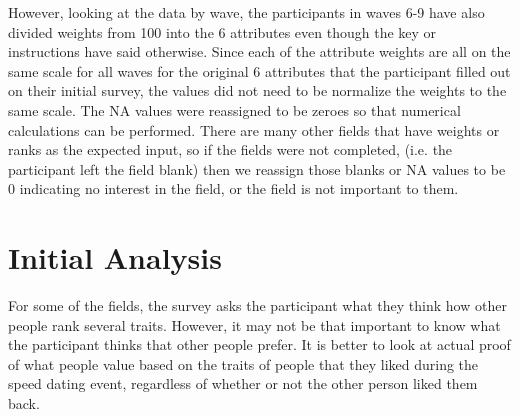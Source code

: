 \documentclass{article}
\begin{document}
However, looking at the data by wave, the participants in waves 6-9 have also divided weights from 100 into the 6 attributes even though the key or instructions have said otherwise. Since each of the attribute weights are all on the same scale for all waves for the original 6 attributes that the participant filled out on their initial survey, the values did not need to be normalize the weights to the same scale.  The NA values were reassigned to be zeroes so that numerical calculations can be performed.  There are many other fields that have weights or ranks as the expected input, so if the fields were not completed, (i.e. the participant left the field blank) then we reassign those blanks or NA values to be 0 indicating no interest in the field, or the field is not important to them.\\



\section{Initial Analysis}

For some of the fields, the survey asks the participant what they think how other people rank several traits. However, it may not be that important to know what the participant thinks that other people prefer.  It is better to look at actual proof of what people value based on the traits of people that they liked during the speed dating event, regardless of whether or not the other person liked them back.\\
\end{document}
